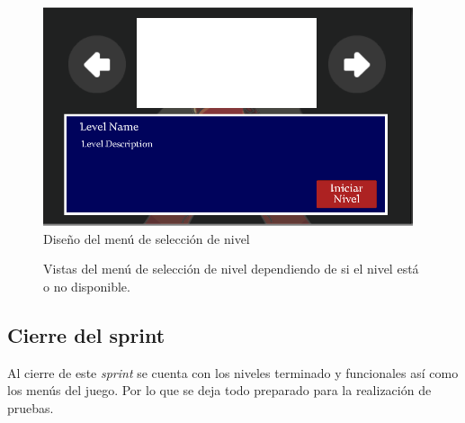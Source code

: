\begin{figure}[h]
        \centering
        \includegraphics[height=0.2 \textheight]{03TrabajoRealizado/imagenes/menuctrlPanel04.png}
        \caption{Diseño del menú de selección de nivel}
        \label{fig:menuSelectIntefaz}
\end{figure}


\begin{figure}
  \centering
   
     
  \caption{Vistas del menú de selección de nivel dependiendo de si el nivel está o no disponible.}
  \label{fig:MenuSelect}
\end{figure}

\subsection{Cierre del sprint}
Al cierre de este \textit{sprint} se cuenta con los niveles terminado y funcionales
así como los menús del juego. Por lo que se deja todo preparado para la realización
de pruebas.

